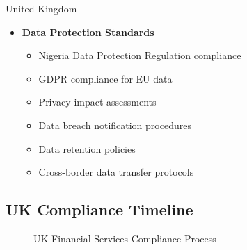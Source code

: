 \begin{regionalbox}{United Kingdom}
\begin{itemize}
    \item \textbf{Data Protection Standards}
    \begin{itemize}
        \item Nigeria Data Protection Regulation compliance
        \item GDPR compliance for EU data
        \item Privacy impact assessments
        \item Data breach notification procedures
        \item Data retention policies
        \item Cross-border data transfer protocols
    \end{itemize}
\end{itemize}
\end{regionalbox}

\FloatBarrier
\subsection{UK Compliance Timeline}
\begin{figure}[htbp]
    \centering
    \caption{UK Financial Services Compliance Process}
    \label{fig:uk-compliance}
\end{figure}

